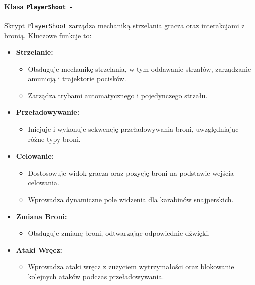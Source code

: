 \paragraph{Klasa \texttt{PlayerShoot -}}
Skrypt \texttt{PlayerShoot} zarządza mechaniką strzelania gracza oraz interakcjami z bronią. Kluczowe funkcje to:
\begin{itemize}
  \item \textbf{Strzelanie:}
    \begin{itemize}
      \item Obsługuje mechanikę strzelania, w tym oddawanie strzałów, zarządzanie amunicją i trajektorie pocisków.
      \item Zarządza trybami automatycznego i pojedynczego strzału.
    \end{itemize}
  \item \textbf{Przeładowywanie:}
    \begin{itemize}
      \item Inicjuje i wykonuje sekwencję przeładowywania broni, uwzględniając różne typy broni.
    \end{itemize}
  \item \textbf{Celowanie:}
    \begin{itemize}
      \item Dostosowuje widok gracza oraz pozycję broni na podstawie wejścia celowania.
      \item Wprowadza dynamiczne pole widzenia dla karabinów snajperskich.
    \end{itemize}
  \item \textbf{Zmiana Broni:}
    \begin{itemize}
      \item Obsługuje zmianę broni, odtwarzając odpowiednie dźwięki.
    \end{itemize}
  \item \textbf{Ataki Wręcz:}
    \begin{itemize}
      \item Wprowadza ataki wręcz z zużyciem wytrzymałości oraz blokowanie kolejnych ataków podczas przeładowywania.
    \end{itemize}
\end{itemize}

